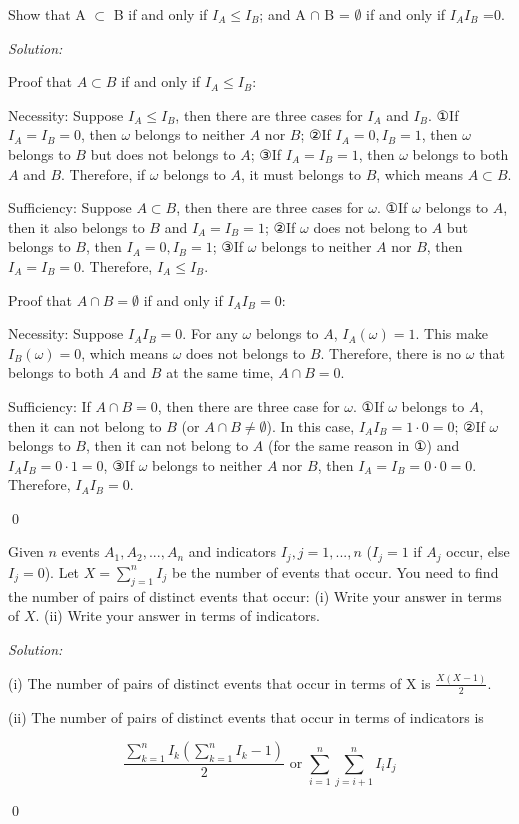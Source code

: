 \documentclass[12pt]{article}
\newenvironment{problem}[2][Problem]{\begin{trivlist}
\item[\hskip \labelsep {\bfseries #1}\hskip \labelsep {\bfseries #2.}]}{\end{trivlist}}
\newenvironment{sol}
    {\emph{Solution:}
    }
    {
    \qed
    }
\begin{document}
\begin{problem}{5}
Show that A $\subset$ B if and only if $I_{A} \leq I_{B}$; and A $\cap$ B =  $\emptyset$ if and only if
$I_{A}I_{B}$ =0.
\end{problem}
\begin{sol}

Proof that $A\subset B$ if and only if $I_A\leq I_B$:

Necessity: Suppose $I_A\leq I_B$, then there are three cases for $I_A$ and $I_B$. ①If $I_A=I_B=0$, then $\omega$ belongs to neither $A$ nor $B$; ②If $I_A=0, I_B=1$, then $\omega$ belongs to $B$ but does not belongs to $A$; ③If $I_A=I_B=1$, then $\omega$ belongs to both $A$ and $B$. Therefore, if $\omega$ belongs to $A$, it must belongs to $B$, which means $A\subset B$.

Sufficiency: Suppose $A\subset B$, then there are three cases for $\omega$. ①If $\omega$ belongs to $A$, then it also belongs to $B$ and $I_A=I_B=1$; ②If $\omega$ does not belong to $A$ but belongs to $B$, then $I_A=0, I_B=1$; ③If $\omega$ belongs to neither $A$ nor $B$, then $I_A=I_B=0$. Therefore, $I_A\leq I_B$.

Proof that $A\cap B=\emptyset$ if and only if $I_AI_B=0$:

Necessity: Suppose $I_AI_B=0$. For any $\omega$ belongs to $A$, $I_A(\omega)=1$. This make $I_B(\omega)=0$, which means $\omega$ does not belongs to $B$. Therefore, there is no $\omega$ that belongs to both $A$ and $B$ at the same time, $A\cap B=0$.

Sufficiency: If $A\cap B=0$, then there are three case for $\omega$. ①If $\omega$ belongs to $A$, then it can not belong to $B$ (or $A\cap B\neq\emptyset$). In this case, $I_AI_B=1\cdot0=0$; ②If $\omega$ belongs to $B$, then it can not belong to $A$ (for the same reason in ①) and $I_AI_B=0\cdot1=0$, ③If $\omega$ belongs to neither $A$ nor $B$, then $I_A=I_B=0\cdot0=0$. Therefore, $I_AI_B=0$.
\end{sol}



\begin{problem}{6}
Given $n$ events $A_1,A_2, ..., A_n$ and indicators $I_j, j=1,...,n$ ($I_j=1$ if $A_j$ occur, else $I_j=0$). Let $X=\sum_{j=1}^n I_j$ be the number of events that occur. You need to find the number of pairs of distinct events that occur: (i) Write your answer in terms of $X$. (ii) Write your answer in terms of indicators.
\end{problem}
\begin{sol}

(i) The number of pairs of distinct events that occur in terms of X is $\frac{X(X-1)}{2}$.

(ii) The number of pairs of distinct events that occur in terms of indicators is

\[
\frac{\sum_{k=1}^nI_k(\sum_{k=1}^nI_k-1)}{2}\text{ or }\sum_{i=1}^n\sum_{j=i+1}^nI_iI_j
\]

\end{sol}
\end{document}
